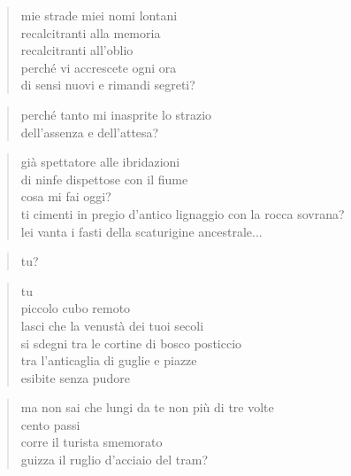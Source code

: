 \begin{verse}
    mie strade miei nomi lontani\\
    recalcitranti alla memoria\\
    recalcitranti all'oblio\\
    perché vi accrescete ogni ora\\
    di sensi nuovi e rimandi segreti?
\end{verse}

\begin{verse}
    perché tanto mi inasprite lo strazio\\
    dell'assenza e dell'attesa?
\end{verse}

\clearpage


\begin{verse}
    già spettatore alle ibridazioni\\
    di ninfe dispettose con il fiume\\
    cosa mi fai oggi?\\
    ti cimenti in pregio d'antico lignaggio con la rocca sovrana?\\
    lei vanta i fasti della scaturigine ancestrale...
\end{verse}

\begin{verse}
    tu?
\end{verse}

\begin{verse}
    tu\\
    piccolo cubo remoto\\
    lasci che la venustà dei tuoi secoli\\
    si sdegni tra le cortine di bosco posticcio\\
    tra l'anticaglia di guglie e piazze\\
    esibite senza pudore
\end{verse}

\begin{verse}
    ma non sai che lungi da te non più di tre volte\\
    cento passi\\
    corre il turista smemorato\\
    guizza il ruglio d'acciaio del tram?
\end{verse}

\clearpage



